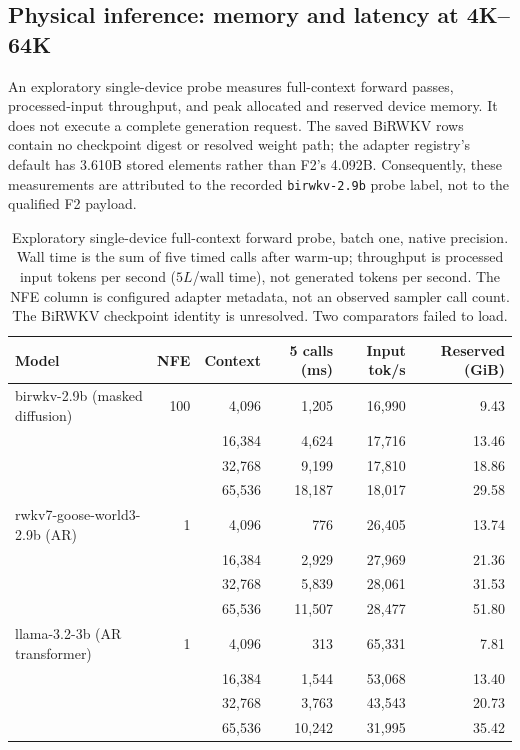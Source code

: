 \subsection{Physical inference: memory and latency at 4K--64K}
\label{m:systems}

An exploratory single-device probe measures full-context forward passes, processed-input
throughput, and peak allocated and reserved device memory. It does not execute a
complete generation request. The saved BiRWKV rows contain no checkpoint digest or
resolved weight path; the adapter registry's default has 3.610B stored elements rather
than F2's 4.092B. Consequently, these measurements are attributed to the recorded
\texttt{birwkv-2.9b} probe label, not to the qualified F2 payload.

\begin{table}[t]
\centering\small
\caption{Exploratory single-device full-context forward probe, batch one, native
precision. Wall time is the sum of five timed calls after warm-up; throughput is
processed input tokens per second ($5L$/wall time), not generated tokens per second.
The NFE column is configured adapter metadata, not an observed sampler call count.
The BiRWKV checkpoint identity is unresolved. Two comparators failed to load.}
\begin{tabular}{@{}lrrrrr@{}}
\toprule
Model & NFE & Context & 5 calls (ms) & Input tok/s & Reserved (GiB)\\
\midrule
birwkv-2.9b (masked diffusion) & 100 & 4{,}096 & 1{,}205 & 16{,}990 & 9.43\\
 & & 16{,}384 & 4{,}624 & 17{,}716 & 13.46\\
 & & 32{,}768 & 9{,}199 & 17{,}810 & 18.86\\
 & & 65{,}536 & 18{,}187 & 18{,}017 & 29.58\\
\midrule
rwkv7-goose-world3-2.9b (AR) & 1 & 4{,}096 & 776 & 26{,}405 & 13.74\\
 & & 16{,}384 & 2{,}929 & 27{,}969 & 21.36\\
 & & 32{,}768 & 5{,}839 & 28{,}061 & 31.53\\
 & & 65{,}536 & 11{,}507 & 28{,}477 & 51.80\\
\midrule
llama-3.2-3b (AR transformer) & 1 & 4{,}096 & 313 & 65{,}331 & 7.81\\
 & & 16{,}384 & 1{,}544 & 53{,}068 & 13.40\\
 & & 32{,}768 & 3{,}763 & 43{,}543 & 20.73\\
 & & 65{,}536 & 10{,}242 & 31{,}995 & 35.42\\

\end{tabular}
\end{table}
